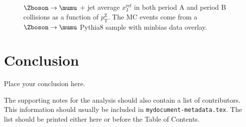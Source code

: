 \documentclass[NOTE, atlasdraft=true, texlive=2016, USenglish]{\ATLASLATEXPATH atlasdoc}
\begin{document}
\begin{figure}[htbp]
	\centering
	 \\
	 \\
	\caption{$\Zboson\rightarrow\mumu$ + jet average $x_{\text{J}}^{\text{ref}}$ in both period A and period B collisions as a function of $p_{\text{T}}^{\text{Z}}$. The MC events come from a $\Zboson\rightarrow\mumu$ Pythia8 sample with minbias data overlay.}
	\label{fig:xjzmumuPABDO}
\end{figure}

\section{Conclusion}
\label{sec:conclusion}

Place your conclusion here.


\printbibliography
% 
% 

\clearpage
The supporting notes for the analysis should also contain a list of contributors.
This information should usually be included in \texttt{mydocument-metadata.tex}.
The list should be printed either here or before the Table of Contents.
\end{document}
